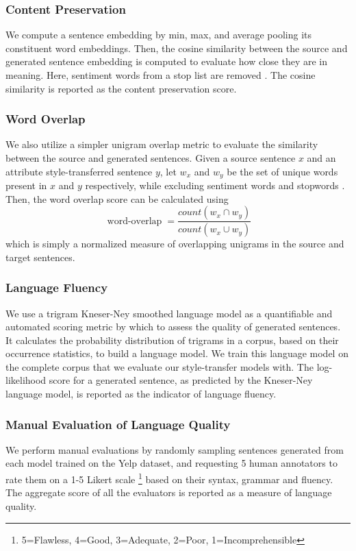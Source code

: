 \documentclass[letterpaper]{article} %
\begin{document}
\subsubsection{Content Preservation}
We compute a sentence embedding by min, max, and average pooling its constituent word embeddings.
Then, the cosine similarity between the source and generated sentence embedding is computed to evaluate how close they are in meaning.
Here, sentiment words from a stop list \cite{hu2004mining} are removed \cite{fu2017style}.
The cosine similarity is reported as the content preservation score.

\subsubsection{Word Overlap}
We also utilize a simpler unigram overlap metric to evaluate the similarity between the source and generated sentences.
Given a source sentence $x$ and an attribute style-transferred sentence $y$, let $w_x$ and $w_y$ be the set of unique words present in $x$ and $y$ respectively, while excluding sentiment words \cite{hu2004mining} and stopwords \cite{bird2004nltk}.
Then, the word overlap score can be calculated using $$\operatorname{word-overlap} = \frac{count(w_x \cap w_y)}{count(w_x \cup w_y)}$$ which is simply a normalized measure of overlapping unigrams in the source and target sentences.

\subsubsection{Language Fluency}
We use a trigram Kneser-Ney smoothed language model \cite{kneser1995improved} as a quantifiable and automated scoring metric by which to assess the quality of generated sentences.
It calculates the probability distribution of trigrams in a corpus, based on their occurrence statistics, to build a language model.
We train this language model on the complete corpus that we evaluate our style-transfer models with.
The log-likelihood score for a generated sentence, as predicted by the Kneser-Ney language model, is reported as the indicator of language fluency.

\subsubsection{Manual Evaluation of Language Quality}
We perform manual evaluations by randomly sampling sentences generated from each model trained on the Yelp dataset, and requesting 5 human annotators to rate them on a 1-5 Likert scale \footnote{5=Flawless, 4=Good, 3=Adequate, 2=Poor, 1=Incomprehensible} \cite{stent2005evaluating} based on their syntax, grammar and fluency.
The aggregate score of all the evaluators is reported as a measure of language quality.
\end{document}
